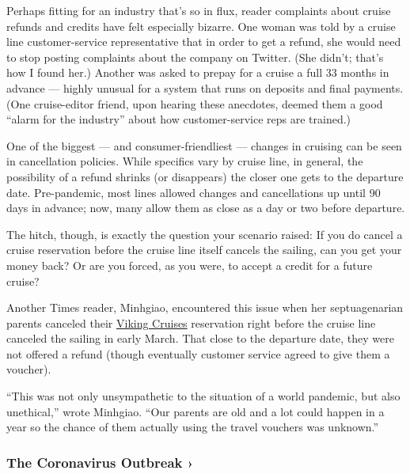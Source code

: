 Perhaps fitting for an industry that's so in flux, reader complaints
about cruise refunds and credits have felt especially bizarre. One woman
was told by a cruise line customer-service representative that in order
to get a refund, she would need to stop posting complaints about the
company on Twitter. (She didn't; that's how I found her.) Another was
asked to prepay for a cruise a full 33 months in advance --- highly
unusual for a system that runs on deposits and final payments. (One
cruise-editor friend, upon hearing these anecdotes, deemed them a good
``alarm for the industry'' about how customer-service reps are trained.)

One of the biggest --- and consumer-friendliest --- changes in cruising
can be seen in cancellation policies. While specifics vary by cruise
line, in general, the possibility of a refund shrinks (or disappears)
the closer one gets to the departure date. Pre-pandemic, most lines
allowed changes and cancellations up until 90 days in advance; now, many
allow them as close as a day or two before departure.

The hitch, though, is exactly the question your scenario raised: If you
do cancel a cruise reservation before the cruise line itself cancels the
sailing, can you get your money back? Or are you forced, as you were, to
accept a credit for a future cruise?

Another Times reader, Minhgiao, encountered this issue when her
septuagenarian parents canceled their
\href{https://www.vikingcruises.com/}{Viking Cruises} reservation right
before the cruise line canceled the sailing in early March. That close
to the departure date, they were not offered a refund (though eventually
customer service agreed to give them a voucher).

``This was not only unsympathetic to the situation of a world pandemic,
but also unethical,'' wrote Minhgiao. ``Our parents are old and a lot
could happen in a year so the chance of them actually using the travel
vouchers was unknown.''

\href{https://www.nytimes.com/news-event/coronavirus?action=click\&pgtype=Article\&state=default\&region=MAIN_CONTENT_3\&context=storylines_faq}{}

\hypertarget{the-coronavirus-outbreak-}{%
\subsubsection{The Coronavirus Outbreak
›}\label{the-coronavirus-outbreak-}}

